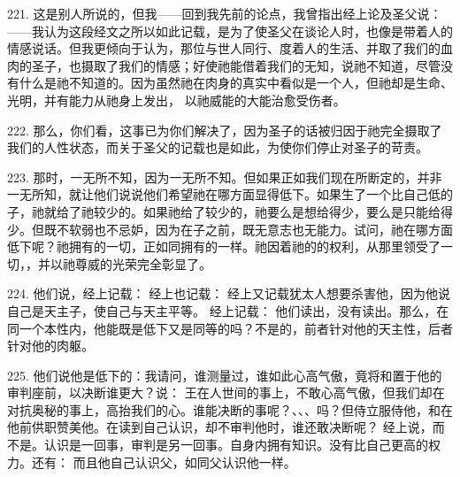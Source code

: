 221. 这是别人所说的，但我——回到我先前的论点，我曾指出经上论及圣父说：——我认为这段经文之所以如此记载，是为了使圣父在谈论人时，也像是带着人的情感说话。但我更倾向于认为，那位与世人同行、度着人的生活、并取了我们的血肉的圣子，也摄取了我们的情感；好使祂能借着我们的无知，说祂不知道，尽管没有什么是祂不知道的。因为虽然祂在肉身的真实中看似是一个人，但祂却是生命、光明，并有能力从祂身上发出， 以祂威能的大能治愈受伤者。\par

222. 那么，你们看，这事已为你们解决了，因为圣子的话被归因于祂完全摄取了我们的人性状态，而关于圣父的记载也是如此，为使你们停止对圣子的苛责。\par

223. 那时，一无所不知，因为一无所不知。但如果正如我们现在所断定的，并非一无所知，就让他们说说他们希望祂在哪方面显得低下。如果生了一个比自己低的子，祂就给了祂较少的。如果祂给了较少的，祂要么是想给得少，要么是只能给得少。但既不软弱也不忌妒，因为在子之前，既无意志也无能力。试问，祂在哪方面低下呢？祂拥有的一切，正如同拥有的一样。祂因着祂的的权利，从那里领受了一切，，并以祂尊威的光荣完全彰显了。\par

224. 他们说，经上记载：  经上也记载：  经上又记载犹太人想要杀害他，因为他说自己是天主子，使自己与天主平等。 经上记载：  他们读出，没有读出。那么，在同一个本性内，他能既是低下又是同等的吗？不是的，前者针对他的天主性，后者针对他的肉躯。\par

225. 他们说他是低下的：我请问，谁测量过，谁如此心高气傲，竟将和置于他的审判座前，以决断谁更大？说： 王在人世间的事上，不敢心高气傲，但我们却在对抗奥秘的事上，高抬我们的心。谁能决断的事呢？、、、吗？但侍立服侍他，和在他前供职赞美他。在读到自己认识，却不审判他时，谁还敢决断呢？  经上说，而不是。认识是一回事，审判是另一回事。自身内拥有知识。没有比自己更高的权力。还有： 而且他自己认识父，如同父认识他一样。\par

